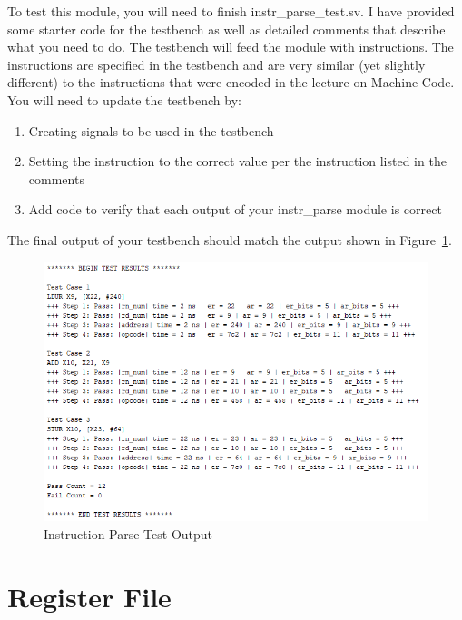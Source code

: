 To test this module, you will need to finish instr\_parse\_test.sv.  I have provided some starter code for the testbench as well as detailed comments that describe what you need to do.  The testbench will feed the module with instructions.  The instructions are specified in the testbench and are very similar (yet slightly different) to the instructions that were encoded in the lecture on Machine Code.  You will need to update the testbench by:

\begin{enumerate}
	\item Creating signals to be used in the testbench
	\item Setting the instruction to the correct value per the instruction listed in the comments
	\item Add code to verify that each output of your instr\_parse module is correct
\end{enumerate}

The final output of your testbench should match the output shown in Figure~\ref{fig:instr_parse_test_output}.

\begin{figure}
	\caption{Instruction Parse Test Output}\label{fig:instr_parse_test_output}
	\begin{center}
		\includegraphics[width=4.75in]{../images/instr_parse_test_output.png}
	\end{center}
\end{figure}

\section{Register File}

